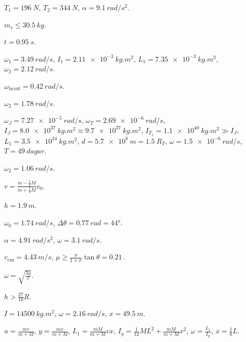 \begin{enumerate*}[label = \vspace{0.15cm} \textbf{(\arabic*)}]
  \item $T_1 = \SI{196}{N}$, $T_2 = \SI{344}{N}$, $\alpha = \SI{9.1}{rad/s^2}$.
  \item $m_s \leq \SI{30.5}{kg}$.
  \item $t = \SI{0.95}{s}$.
  \item $\omega_1 = \SI{3.49}{rad/s}$, $I_1 = \SI{2.11e-3}{kg.m^2}$, $L_1 = \SI{7.35e-3}{kg.m^2}$, $\omega_2 = \SI{2.12}{rad/s}$.
  \item $\omega_{\text{braut}} = \SI{0.42}{rad/s}$.
  \item $\omega_2 = \SI{1.78}{rad/s}$.
  \item $\omega_J = \SI{7.27e-5}{rad/s}$, $\omega_T = \SI{2.69e-6}{rad/s}$, $I_J = \SI{8.0e37}{kg.m^2} \approx \SI{9.7e37}{kg.m^2}$, $I_{T_{1}} = \SI{1.1e40}{kg.m^2} \gg I_J$, $L_1 = \SI{3.5e34}{kg.m^2}$, $d = \SI{5.7e8}{m} = \SI{1.5}{}R_T$, $\omega = \SI{1.5e-6}{rad/s}$, $T = \SI{49}{dagar}$.
  \item $\omega_2 = \SI{1.06}{rad/s}$.
  \item $v = \frac{m-\frac{1}{3}M}{m+\frac{1}{3}M}v_0$.
  \item $h = \SI{1.9}{m}$.
  \item $\omega_0 = \SI{1.74}{rad/s}$, $\Delta \theta = \SI{0.77}{rad} = \ang{44}$.
  \item $\alpha = \SI{4.91}{rad/s^2}$, $\omega = \SI{3.1}{rad/s}$.
  \item $v_{\text{cm}} = \SI{4.43}{m/s}$, $\mu \geq \frac{\sigma}{1+\sigma}\tan\theta = \SI{0.21}{}$.
  \item $\omega = \sqrt{\frac{3g}{\ell}}$. \item $h > \frac{27}{10}R$.
  \item $I = \SI{14500}{kg.m^2}$, $\omega = \SI{2.16}{rad/s}$, $x = \SI{49.5}{m}$.
  \item $u = \frac{mv}{m+M}$, $y = \frac{mx}{m+M}$, $L_1 = \frac{mM}{m+M}vx$, $I_y = \frac{1}{12}ML^2 + \frac{mM}{m+M}x^2$, $\omega = \frac{L_1}{I_y}$, $x = \frac{1}{6}L$.
\end{enumerate*}


\newpage